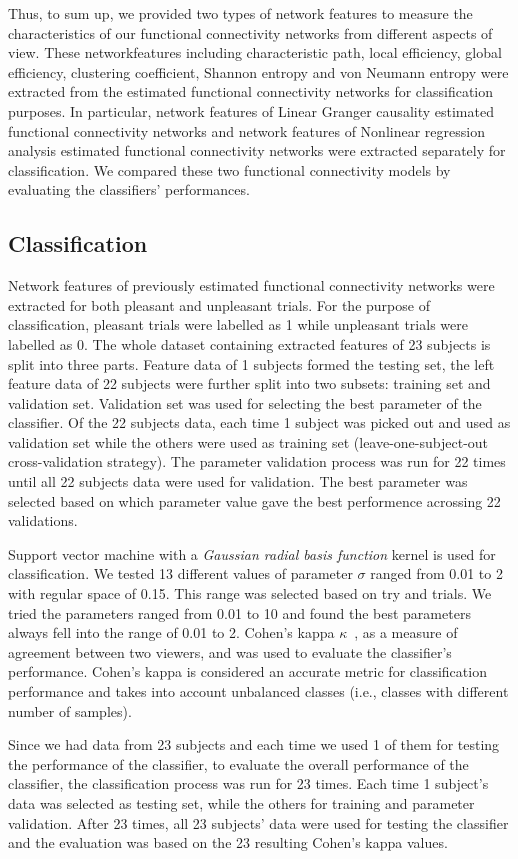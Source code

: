 Thus, to sum up, we provided two types of network features to measure the characteristics of our functional connectivity networks from different aspects of view. These networkfeatures including characteristic path, local efficiency, global efficiency, clustering coefficient, Shannon entropy and von Neumann entropy were extracted from the estimated functional connectivity networks for classification purposes. In particular, network features of Linear Granger causality estimated functional connectivity networks and network features of Nonlinear regression analysis estimated functional connectivity networks were extracted separately for classification. We compared these two functional connectivity models by evaluating the classifiers' performances. 

\subsection{Classification}
Network features of previously estimated functional connectivity networks were extracted for both pleasant and unpleasant trials. For the purpose of classification, pleasant trials were labelled as 1 while unpleasant trials were labelled as 0. The whole dataset containing extracted features of 23 subjects is split into three parts. Feature data of 1 subjects formed the testing set, the left feature data of 22 subjects were further split into two subsets: training set and validation set. Validation set was used for selecting the best parameter of the classifier. Of the 22 subjects data, each time 1 subject was picked out and used as validation set while the others were used as training set (leave-one-subject-out cross-validation strategy). The parameter validation process was run for 22 times until all 22 subjects data were used for validation. The best parameter was selected based on which parameter value gave the best performence acrossing 22 validations.    

Support vector machine with a \emph{Gaussian radial basis function} kernel is used for classification. We tested 13 different values of parameter $\sigma$ ranged from 0.01 to 2 with regular space of 0.15. This range was selected based on try and trials. We tried the parameters ranged from 0.01 to 10 and found the best parameters always fell into the range of 0.01 to 2. Cohen's kappa $\kappa$~\cite{uebersax1987diversity}, as a measure of agreement between two viewers, and was used to evaluate the classifier's performance. Cohen's kappa is considered an accurate metric for classification performance and takes into account unbalanced classes (i.e., classes with different number of samples). 

Since we had data from 23 subjects and each time we used 1 of them for testing the performance of the classifier, to evaluate the overall performance of the classifier, the classification process was run for 23 times. Each time 1 subject's data was selected as testing set, while the others for training and parameter validation. After 23 times, all 23 subjects' data were used for testing the classifier and the evaluation was based on the 23 resulting Cohen's kappa values. 
